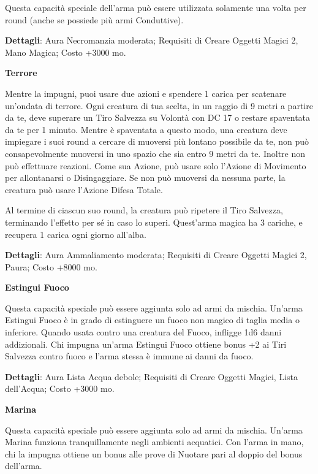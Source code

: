 \documentclass[a4paper,twoside,openany]{book}
\begin{document}
Questa capacità speciale dell'arma può essere utilizzata solamente una volta per round (anche se possiede più armi Conduttive).

\textbf{Dettagli}: Aura Necromanzia moderata; Requisiti di Creare Oggetti Magici 2, Mano Magica; Costo +3000 mo.

\smallskip* \textbf{Terrore}\hypertarget{Terrore}{}

Mentre la impugni, puoi usare due azioni e spendere 1 carica per scatenare un'ondata di terrore.
Ogni creatura di tua scelta, in un raggio di 9 metri a partire da te, deve superare un Tiro Salvezza su Volontà con DC 17 o restare spaventata da te per 1 minuto. Mentre è spaventata a questo modo, una creatura deve impiegare i suoi round a cercare di muoversi più lontano possibile da te, non può consapevolmente muoversi in uno spazio che sia entro 9 metri da te. Inoltre non può effettuare reazioni. Come sua Azione, può usare solo l'Azione di Movimento per allontanarsi o Disingaggiare. Se non può muoversi da nessuna parte, la creatura può usare l'Azione Difesa Totale.

Al termine di ciascun suo round, la creatura può ripetere il Tiro Salvezza, terminando l'effetto per sé in caso lo superi. Quest'arma magica ha 3 cariche, e recupera 1 carica ogni giorno all'alba.

\textbf{Dettagli}: Aura Ammaliamento moderata; Requisiti di Creare Oggetti Magici 2, Paura; Costo +8000 mo.

\smallskip* \textbf{Estingui Fuoco}\hypertarget{Estingui Fuoco}{}

Questa capacità speciale può essere aggiunta solo ad armi da mischia. Un'arma Estingui Fuoco è in grado di estinguere un fuoco non magico di taglia media o inferiore. Quando usata contro una creatura del Fuoco, infligge 1d6 danni addizionali. Chi impugna un'arma Estingui Fuoco ottiene bonus +2 ai Tiri Salvezza contro fuoco e l'arma stessa è immune ai danni da fuoco.

\textbf{Dettagli}: Aura Lista Acqua debole; Requisiti di Creare Oggetti Magici, Lista dell'Acqua; Costo +3000 mo.

\smallskip* \textbf{Marina}\hypertarget{Marina}{}

Questa capacità speciale può essere aggiunta solo ad armi da mischia. Un'arma Marina funziona tranquillamente negli ambienti acquatici. Con l'arma in mano, chi la impugna ottiene un bonus alle prove di Nuotare pari al doppio del bonus dell'arma.
\end{document}
